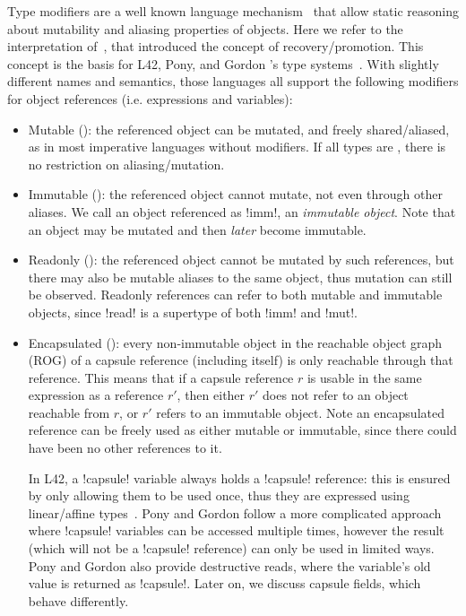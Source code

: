 Type modifiers
 are a well known language mechanism~\cite{TschantzErnst05,BirkaErnst04,OstlundEtAl08,clebsch2015deny,GianniniEtAl16,GordonEtAl12}
 that allow static reasoning about mutability and aliasing properties of objects. Here we refer to the interpretation of~\cite{GordonEtAl12}, that introduced the concept of recovery/promotion. This concept is the basis for L42, Pony, and Gordon \etal's type systems~\cite{GordonEtAl12,ServettoEtAl13a,ServettoZucca15,clebsch2015deny,clebsch2017orca}. With slightly different names and semantics, those languages all support the following modifiers for object references (i.e. expressions and variables):
\SSI\begin{itemize}
\item Mutable (\Q@mut@): the referenced object can be mutated, and freely shared/aliased, as in most imperative languages without modifiers.
If all types are \Q@mut@, there is no restriction on aliasing/mutation.
\item Immutable (\Q@imm@): the referenced object cannot mutate, not even through other aliases. We call an object referenced as \Q!imm!, an \emph{immutable object}. Note that an object may be mutated and then \emph{later} become immutable.
\item Readonly (\Q@read@): the referenced object cannot be mutated by such references, but there may also be mutable aliases to the same object, thus mutation can still be observed. Readonly references can refer to both mutable and immutable objects, since \Q!read! is a supertype of both \Q!imm! and \Q!mut!.
\item Encapsulated (\Q@capsule@):
every non-immutable object in the reachable object graph (ROG) of a capsule reference (including itself) is only reachable through that reference. This means that if a capsule reference $r$ is usable in the same expression as a reference $r'$, then either $r'$ does not refer to an object reachable from $r$, or $r'$ refers to an immutable object. Note an encapsulated reference can be freely used as either mutable or immutable, since there could have been no other references to it.

In L42, a \Q!capsule! variable always holds a \Q!capsule! reference: this is ensured by only allowing them to be used once, thus they are expressed using linear/affine types~\cite{boyland2001alias}. 
Pony and Gordon \etal follow a more complicated approach where \Q!capsule! variables can be accessed multiple times, however the result (which will not be a \Q!capsule! reference) can only be used in limited ways. Pony and Gordon also provide destructive reads, where the variable's old value is returned as \Q!capsule!.
Later on, we discuss capsule fields, which behave differently.
\end{itemize}

